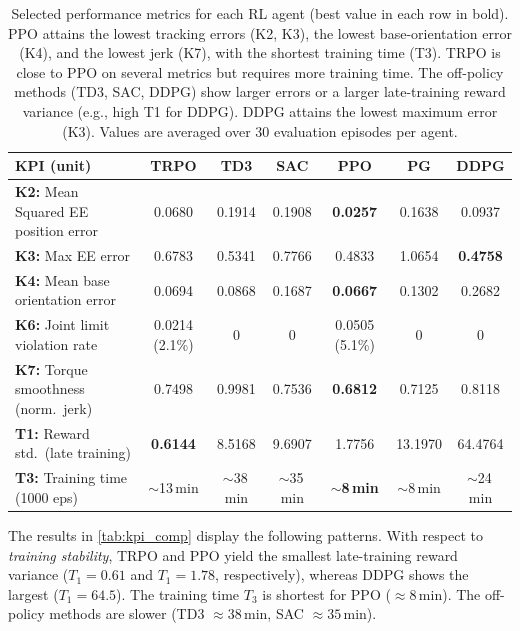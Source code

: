 \documentclass{ieeeaccess}
\begin{document}
\begin{table}[!t]
\centering
\caption{Selected performance metrics for each RL agent (best value in each row in bold).
PPO attains the
lowest tracking errors (K2, K3), the lowest base-orientation error (K4), and the lowest jerk
(K7), with the
shortest training time (T3). TRPO is close to PPO on several metrics but requires
more training time. The
off-policy methods (TD3, SAC, DDPG) show larger errors or a larger late-training reward variance
(e.g., high
T1 for DDPG). DDPG attains the lowest maximum error (K3). Values are averaged over
30 evaluation episodes per agent.}
\label{tab:kpi_comp}
\renewcommand{\arraystretch}{1.3}
\setlength{\tabcolsep}{8pt}
\begin{tabular}{lcccccc}
\toprule
\textbf{KPI (unit)} & \textbf{TRPO} & \textbf{TD3} & \textbf{SAC} & \textbf{PPO} & \textbf{PG} & \textbf{DDPG} \\
\midrule
\textbf{K2:} Mean Squared EE position error &
0.0680 & 0.1914 & 0.1908 & \textbf{0.0257} & 0.1638 & 0.0937 \\
\textbf{K3:} Max EE error &
0.6783 & 0.5341 & 0.7766 & 0.4833 & 1.0654 & \textbf{0.4758} \\
\textbf{K4:} Mean base orientation error &
0.0694 & 0.0868 & 0.1687 & \textbf{0.0667} & 0.1302 & 0.2682 \\
\textbf{K6:} Joint limit violation rate &
0.0214 (2.1\%) & 0 & 0 & 0.0505 (5.1\%) & 0 & 0 \\
\textbf{K7:} Torque smoothness (norm.\ jerk) &
0.7498 & 0.9981 & 0.7536 & \textbf{0.6812} & 0.7125 & 0.8118 \\
\textbf{T1:} Reward std.\ (late training) &
\textbf{0.6144} & 8.5168 & 9.6907 & 1.7756 & 13.1970 & 64.4764 \\
\textbf{T3:} Training time (1000 eps) &
$\sim$13\,min & $\sim$38\,min & $\sim$35\,min & \textbf{$\sim$8\,min} & $\sim$8\,min & $\sim$24\,min \\
\bottomrule
\end{tabular}
\end{table}

The results in \autoref{tab:kpi_comp} display the following patterns. With respect to \emph{training stability}, TRPO
and PPO yield the smallest late-training reward variance ($T_1 = 0.61$ and $T_1 = 1.78$,
respectively), whereas DDPG shows the largest ($T_1 = 64.5$). The training time $T_3$ is
shortest for PPO ($\approx 8\,\mathrm{min}$). The off-policy methods are slower (TD3 $\approx 38\,\mathrm{min}$, SAC
$\approx 35\,\mathrm{min}$).
\end{document}
